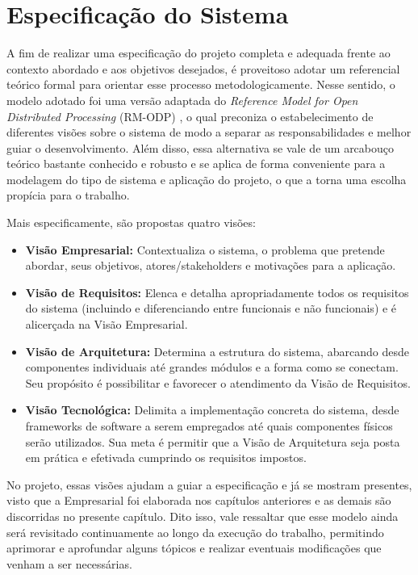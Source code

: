 \chapter{Especificação do Sistema} \label{cap:especificacao}

A fim de realizar uma especificação do projeto completa e adequada frente ao contexto abordado e aos objetivos desejados, é proveitoso adotar um referencial teórico formal para orientar esse processo metodologicamente. Nesse sentido, o modelo adotado foi uma versão adaptada do \textit{Reference Model for Open Distributed Processing} (RM-ODP) \cite{tcc-rmodp}, o qual preconiza o estabelecimento de diferentes visões sobre o sistema de modo a separar as responsabilidades e melhor guiar o desenvolvimento. Além disso, essa alternativa se vale de um arcabouço teórico bastante conhecido e robusto e se aplica de forma conveniente para a modelagem do tipo de sistema e aplicação do projeto, o que a torna uma escolha propícia para o trabalho.

Mais especificamente, são propostas quatro visões:

\begin{itemize}
    \item \textbf{Visão Empresarial:} Contextualiza o sistema, o problema que pretende abordar, seus objetivos, atores/stakeholders e motivações para a aplicação.
    \item \textbf{Visão de Requisitos:} Elenca e detalha apropriadamente todos os requisitos do sistema (incluindo e diferenciando entre funcionais e não funcionais) e é alicerçada na Visão Empresarial.
    \item \textbf{Visão de Arquitetura:} Determina a estrutura do sistema, abarcando desde componentes individuais até grandes módulos e a forma como se conectam. Seu propósito é possibilitar e favorecer o atendimento da Visão de Requisitos.
    \item \textbf{Visão Tecnológica:} Delimita a implementação concreta do sistema, desde frameworks de software a serem empregados até quais componentes físicos serão utilizados. Sua meta é permitir que a Visão de Arquitetura seja posta em prática e efetivada cumprindo os requisitos impostos.
\end{itemize}

No projeto, essas visões ajudam a guiar a especificação e já se mostram presentes, visto que a Empresarial foi elaborada nos capítulos anteriores e as demais são discorridas no presente capítulo. Dito isso, vale ressaltar que esse modelo ainda será revisitado continuamente ao longo da execução do trabalho, permitindo aprimorar e aprofundar alguns tópicos e realizar eventuais modificações que venham a ser necessárias.

